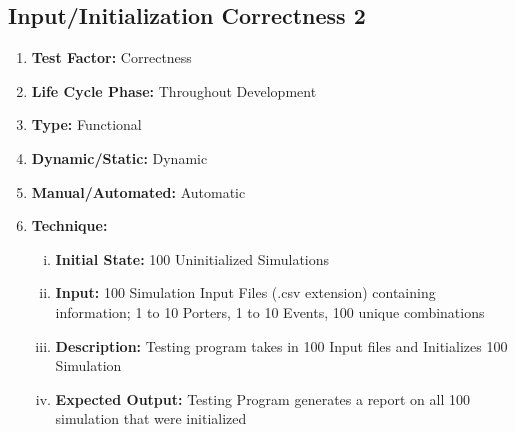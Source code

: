 \documentclass[paper=letter, fontsize=10pt]{scrartcl}
\numberwithin{equation}{section}		%
\numberwithin{figure}{section}			%
\numberwithin{table}{section}				%
\begin{document}
\subsection{Input/Initialization Correctness 2}
\begin{enumerate}[]
	\item \textbf{Test Factor:} Correctness  
	\item \textbf{Life Cycle Phase:} Throughout Development
	\item \textbf{Type:} Functional
	\item \textbf{Dynamic/Static:} Dynamic
	\item \textbf{Manual/Automated:} Automatic
	\item \textbf{Technique:}
		\begin{enumerate}[(i)]
			\item \textbf{Initial State:} 100 Uninitialized Simulations   
			\item \textbf{Input:} 100 Simulation Input Files (.csv extension) containing information; 1 to 10 Porters,  1 to 10 Events, 100 unique combinations
			\item \textbf{Description:} Testing program takes in 100 Input files and Initializes 100 Simulation
			\item \textbf{Expected Output:} Testing Program generates a report on all 100 simulation that were initialized 
		\end{enumerate}
\end{enumerate}
\end{document}
